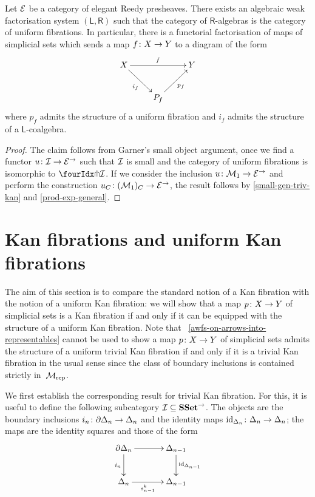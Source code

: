 \documentclass[reqno,10pt,a4paper,oneside]{amsart}
\begin{document}
\begin{corollary} Let $\catE$ be a category of elegant Reedy presheaves. 
There exists an algebraic weak factorisation system $(\mathsf{L}, \mathsf{R})$
such that the category of $\mathsf{R}$-algebras is the category of uniform  fibrations. 
In particular, there is a functorial factorisation of maps of simplicial sets which sends
a map $f \co X \to Y$ to a diagram of the form
\[
\xymatrix{ 
X \ar[rr]^f \ar[dr]_{i_f}  & & Y \\
 & P_f \ar[ur]_{p_f} }
 \]
 where $p_f$ admits the structure of  a uniform  fibration and 
 $i_f$ admits the structure of a $\mathsf{L}$-coalgebra.
\end{corollary} 

\begin{proof} The claim follows from Garner's small object argument, once we find a 
functor $u \co \cal{I} \rightarrow \catE^\to$ such that $\cal{I}$ is small and the
category of uniform  fibrations is isomorphic to $\liftr{\cal{I}}$. If we consider
the inclusion $u \co \mathcal{M}_1 \to \cal{E}^\to$ and perform the construction
$u_\cyl \co (\mathcal{M}_1)_\cyl \to \catE^\to$, the result follows 
by \cref{small-gen-triv-kan} and \cref{prod-exp-general}. 
\end{proof}



\section{Kan fibrations and uniform Kan fibrations}
\label{section-kan-fib}

 The aim of this section is to compare the standard notion of a Kan fibration with the
 notion of a uniform Kan fibration: we will show that a map $p \co X \to Y$ of simplicial
 sets is a Kan fibration if and only if it can be equipped with the structure of a uniform
 Kan fibration. Note that ~\cref{awfs-on-arrows-into-representables} cannot be used to show 
a map $p \co X \to Y$ of simplicial sets admits the structure of a uniform trivial Kan  fibration if and only if it is a trivial Kan fibration in the usual sense since  the class of boundary inclusions  is contained strictly  in~$\cal{M}_{\mathrm{rep}}$. 

 We first establish the corresponding result for 
 trivial Kan fibration. For this, it is useful to define the following subcategory $\cal{I} \subseteq \SSet^\to$. The objects are the boundary inclusions
$i_n \co \partial \Delta_n \to \Delta_n$ and the identity maps $\id_{\Delta_n} \co \Delta_n \to \Delta_n$; the
maps are the identity squares and those of the form
 \[
\xymatrix@C=1.2cm{
  \partial \Delta_n
  \ar[r]
  \ar[d]_{i_n}
&
  \Delta_{n-1}
  \ar[d]^{\id_{\Delta_{n-1}}}
\\
  \Delta_n
  \ar[r]_-{s^k_{n-1}}
&
  \Delta_{n-1}
}
\] 
\end{document}
